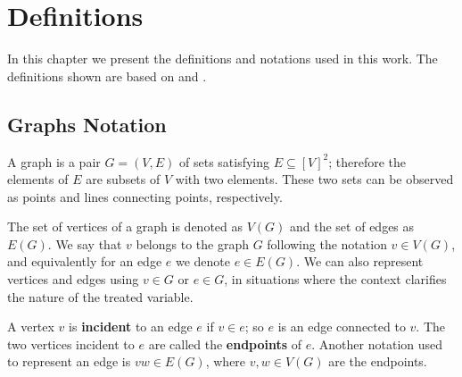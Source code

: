 \chapter{Definitions}
\label{chapter:definitions}

In this chapter we present the definitions and notations used in this work. The definitions shown are based on \cite{BondyNMurty} and \cite{Diestel}.


\section{Graphs Notation}

A graph is a pair \(G = (V, E)\) of sets satisfying \(E \subseteq [V]^2\); therefore the elements of \(E\) are subsets of \(V\) with two elements. These two sets can be observed as points and lines connecting points, respectively.


The set of vertices of a graph is denoted as \(V(G)\) and the set of edges as \(E(G)\). We say that \(v\) belongs to the graph \(G\) following the notation \(v \in V(G)\), and equivalently for an edge \(e\) we denote \(e \in E(G)\). We can also represent vertices and edges using \(v \in G\) or \(e \in G\), in situations where the context clarifies the nature of the treated variable.


A vertex \(v\) is \textbf{incident} to an edge \(e\) if \(v \in e\); so \(e\) is an edge connected to \(v\). The two vertices incident to \(e\) are called the \textbf{endpoints} of \(e\). Another notation used to represent an edge is \(vw \in E(G)\), where \(v, w \in V(G)\) are the endpoints.

